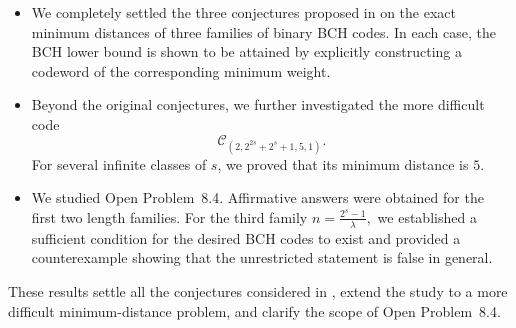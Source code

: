 \documentclass[12pt,draftcls,journal,onecolumn]{IEEEtran}
\begin{document}
\begin{itemize}

\item We completely settled the three conjectures proposed in \cite{Chen59} on the exact minimum distances of three families of binary BCH codes. In each case, the BCH lower bound is shown to be attained by explicitly constructing a codeword of the corresponding minimum weight.

\item Beyond the original conjectures, we further investigated the more difficult code
\[
\mathcal{C}_{(2,2^{2s}+2^s+1,5,1)}.
\]
For several infinite classes of \(s\), we proved that its minimum distance is \(5\).

\item We studied Open Problem~8.4. Affirmative answers were obtained for the first two length families. For the third family
$
n=\frac{2^s-1}{\lambda},
$
we established a sufficient condition for the desired BCH codes to exist and provided a counterexample showing that the unrestricted statement is false in general.

\end{itemize}

These results settle all the conjectures considered in \cite{Chen59}, extend the study to a more difficult minimum-distance problem, and clarify the scope of Open Problem~8.4.
\end{document}
